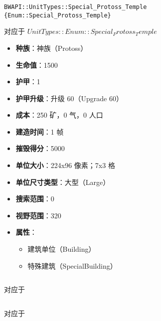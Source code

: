 \begin{tcolorbox}[colback=white, colframe=black!60!white, title=Special\_Protoss\_Temple(), arc=0mm]
    \begin{verbatim}
BWAPI::UnitTypes::Special_Protoss_Temple {Enum::Special_Protoss_Temple}
    \end{verbatim}
    对应于  $ UnitTypes::Enum::Special_Protoss_Temple $ 
    \begin{itemize}
        \item \textbf{种族}：神族（Protoss）
        \item \textbf{生命值}：1500
        \item \textbf{护甲}：1
        \item \textbf{护甲升级}：升级 60（Upgrade 60）
        \item \textbf{成本}：250 矿，0 气，0 人口
        \item \textbf{建造时间}：1 帧
        \item \textbf{摧毁得分}：5000
        \item \textbf{单位大小}：224x96 像素；7x3 格
        \item \textbf{单位尺寸类型}：大型（Large）
        \item \textbf{搜索范围}：0
        \item \textbf{视野范围}：320
        \item \textbf{属性}：
            \begin{itemize}
                \item 建筑单位（Building）
                \item 特殊建筑（SpecialBuilding）
            \end{itemize}
    \end{itemize}
\end{tcolorbox}

\begin{tcolorbox}[colback=white, colframe=black!60!white, title=(), arc=0mm]
    \begin{verbatim}

    \end{verbatim}
    对应于  $  $ 
    
\end{tcolorbox}

\begin{tcolorbox}[colback=white, colframe=black!60!white, title=(), arc=0mm]
    \begin{verbatim}

    \end{verbatim}
    对应于  $  $ 
    
\end{tcolorbox}


